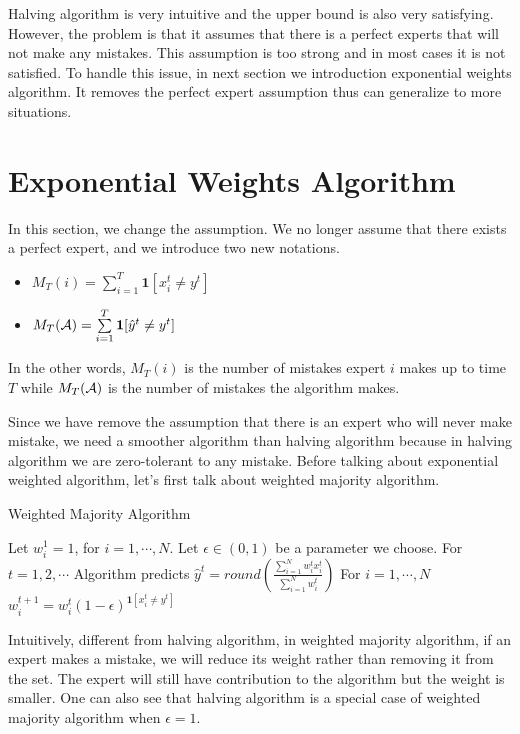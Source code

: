 \documentclass[../main.tex]{subfiles}
\begin{document}
Halving algorithm is very intuitive and the upper bound is also very satisfying. However, the problem is that it assumes that there is a perfect experts that will not make any mistakes. This assumption is too strong and in most cases it is not satisfied. To handle this issue, in next section we introduction exponential weights algorithm. It removes the perfect expert assumption thus can generalize to more situations.

\section{Exponential Weights Algorithm}

In this section, we change the assumption. We no longer assume that there exists a perfect expert, and we introduce two new notations.

\begin{itemize}
	\item $M_T(i) = \sum\limits_{i = 1}^T \mathbf{1}[x^t_i \neq y^t]$
	\item $M_T(\mathcal{A}) = \sum\limits_{i = 1}^T \mathbf{1}[\hat{y}^t \neq y^t]$
\end{itemize}

In the other words, $M_T(i)$ is the number of mistakes expert $i$ makes up to time $T$ while $M_T(\mathcal{A})$ is the number of mistakes the algorithm makes.

Since we have remove the assumption that there is an expert who will never make mistake, we need a smoother algorithm than halving algorithm because in halving algorithm we are zero-tolerant to any mistake. Before talking about exponential weighted algorithm, let's first talk about weighted majority algorithm.


\begin{algorithm}[H]
	\caption{Weighted Majority Algorithm}
	\begin{algorithmic}
		\STATE Let $w_i^1 = 1$, for $i = 1, \cdots, N$.
		\STATE Let $\epsilon \in (0,1)$ be a parameter we choose.
		\STATE For $t = 1,2,\cdots $
		\bindent
		\STATE Algorithm predicts $\hat{y}^t = round(\frac{\sum\limits_{i = 1}^N w_i^t x_i^t}{\sum\limits_{i = 1}^N w_i^t })$ 
		\STATE For $i = 1, \cdots, N$
		\bindentt
		\STATE $w_i^{t+1} = w_i^t (1- \epsilon)^{\mathbf{1}[x_i^t \neq y^t]}$
		\eindentt 
		\eindent
	\end{algorithmic}
\end{algorithm}

Intuitively, different from halving algorithm, in weighted majority algorithm, if an expert makes a mistake, we will reduce its weight rather than removing it from the set. The expert will still have contribution to the algorithm but the weight is smaller. One can also see that halving algorithm is a special case of weighted majority algorithm when $\epsilon = 1$.
\end{document}
